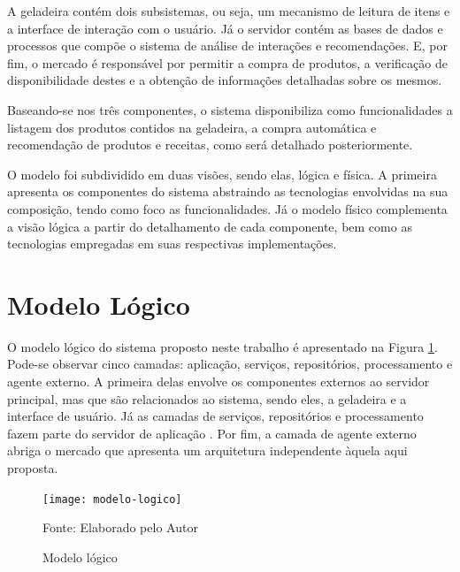 A geladeira contém dois subsistemas, ou seja, um mecanismo de leitura de itens e a interface de interação com o usuário. Já o servidor contém as bases de dados e processos que compõe o sistema de análise de interações e recomendações. E, por fim, o mercado é responsável por permitir a compra de produtos, a verificação de disponibilidade destes e a obtenção de informações detalhadas sobre os mesmos.
    
Baseando-se nos três componentes, o sistema disponibiliza como funcionalidades a listagem dos produtos contidos na geladeira, a compra automática e recomendação de produtos e receitas, como será detalhado posteriormente.
    
O modelo foi subdividido em duas visões, sendo elas, lógica e física. A primeira apresenta os componentes do sistema abstraindo as tecnologias envolvidas na sua composição, tendo como foco as funcionalidades. Já o modelo físico complementa a visão lógica a partir do detalhamento de cada componente, bem como as tecnologias empregadas em suas respectivas implementações.

\section{Modelo Lógico}

O modelo lógico do sistema proposto neste trabalho é apresentado na Figura \ref{fig:c4_modelo_logico}. Pode-se observar cinco camadas: aplicação, serviços, repositórios, processamento e agente externo. A primeira delas envolve os componentes externos ao servidor principal, mas que são relacionados ao sistema, sendo eles, a geladeira e a interface de usuário. Já as camadas de serviços, repositórios e processamento fazem parte do servidor de aplicação%
. Por fim, a camada de agente externo abriga o mercado que apresenta um arquitetura independente àquela aqui proposta.


\begin{figure}[htb]
    \caption{Modelo lógico}
    \label{fig:c4_modelo_logico}
    \texttt{[image: modelo-logico]}
    
    \footnotesize{Fonte: Elaborado pelo Autor}
\end{figure}
\nocite{Freepik2017} %

